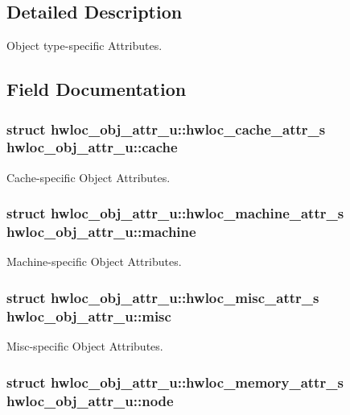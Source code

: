 \subsection{Detailed Description}
Object type-\/specific Attributes. 

\subsection{Field Documentation}
\hypertarget{unionhwloc__obj__attr__u_ab5a8ae3bf490e6b1071fea53f7382836}{
\subsubsection[{cache}]{\setlength{\rightskip}{0pt plus 5cm}struct {\bf hwloc\_\-obj\_\-attr\_\-u::hwloc\_\-cache\_\-attr\_\-s}  {\bf hwloc\_\-obj\_\-attr\_\-u::cache}}}
\label{unionhwloc__obj__attr__u_ab5a8ae3bf490e6b1071fea53f7382836}


Cache-\/specific Object Attributes. \hypertarget{unionhwloc__obj__attr__u_a5b42966df7c5bfdc36891e414cc31607}{
\subsubsection[{machine}]{\setlength{\rightskip}{0pt plus 5cm}struct {\bf hwloc\_\-obj\_\-attr\_\-u::hwloc\_\-machine\_\-attr\_\-s}  {\bf hwloc\_\-obj\_\-attr\_\-u::machine}}}
\label{unionhwloc__obj__attr__u_a5b42966df7c5bfdc36891e414cc31607}


Machine-\/specific Object Attributes. \hypertarget{unionhwloc__obj__attr__u_a33b7e687b61be1b62e22f4037788582c}{
\subsubsection[{misc}]{\setlength{\rightskip}{0pt plus 5cm}struct {\bf hwloc\_\-obj\_\-attr\_\-u::hwloc\_\-misc\_\-attr\_\-s}  {\bf hwloc\_\-obj\_\-attr\_\-u::misc}}}
\label{unionhwloc__obj__attr__u_a33b7e687b61be1b62e22f4037788582c}


Misc-\/specific Object Attributes. \hypertarget{unionhwloc__obj__attr__u_a941994ad83275213249f8adfd8204465}{
\subsubsection[{node}]{\setlength{\rightskip}{0pt plus 5cm}struct {\bf hwloc\_\-obj\_\-attr\_\-u::hwloc\_\-memory\_\-attr\_\-s}  {\bf hwloc\_\-obj\_\-attr\_\-u::node}}}
\label{unionhwloc__obj__attr__u_a941994ad83275213249f8adfd8204465}


